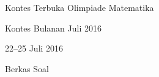 \documentclass[a4paper,12pt]{article}
\begin{document}
\pagestyle{empty}

\begin{center}

\vspace{10em}

{\LARGE Kontes Terbuka Olimpiade Matematika}

\vspace{1em}

{\Large Kontes Bulanan Juli 2016}

\vspace{3em}

{\large 22--25 Juli 2016}

\vspace{20em}

{\Large Berkas Soal}
\end{center}
\clearpage
\setcounter{page}{1}

\newpage

\pagestyle{fancy}
\end{document}
